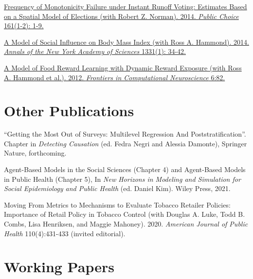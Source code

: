 \documentclass[margin,line]{res}
\newenvironment{publist}{
	\begin{list}{}{%
			\setlength{\itemsep}{0.15in}
			\setlength{\parsep}{0in} \setlength{\parskip}{0in}
			\setlength{\topsep}{0in} \setlength{\partopsep}{0in} 
			\setlength{\leftmargin}{0.15in}
			\setlength{\itemindent}{-0.15in}}}
		{\end{list}}
\begin{document}
\begin{resume}
\begin{publist}
	\item \href{https://joeornstein.github.io/publications/Ornstein-Norman-2014/Ornstein-Norman-2014.pdf}{Frequency of Monotonicity Failure under Instant Runoff Voting: Estimates Based on a Spatial Model of Elections (with Robert Z. Norman). 2014. \textit{Public Choice} 161(1-2): 1-9.}
	
	\item \href{https://joeornstein.github.io/publications/Hammond_et_al-2014-Annals_of_the_New_York_Academy_of_Sciences.pdf}{A Model of Social Influence on Body Mass Index (with Ross A. Hammond). 2014. \textit{Annals of the New York Academy of Sciences} 1331(1): 34-42.}
	
	\item \href{https://joeornstein.github.io/publications/Hammond-2012.pdf}{A Model of Food Reward Learning with Dynamic Reward Exposure (with Ross A. Hammond et al.). 2012. \textit{Frontiers in Computational Neuroscience} 6:82.}	
\end{publist}



\newpage

\section{\sc Other Publications}

\begin{publist}
	\item ``Getting the Most Out of Surveys: Multilevel Regression And Poststratification''. Chapter in \textit{Detecting Causation} (ed. Fedra Negri and Alessia Damonte), Springer Nature, forthcoming.
	\item Agent-Based Models in the Social Sciences (Chapter 4) and Agent-Based Models in Public Health (Chapter 5), In \textit{New Horizons in Modeling and Simulation for Social Epidemiology and Public Health} (ed. Daniel Kim). Wiley Press, 2021. 
	\item Moving From Metrics to Mechanisms to Evaluate Tobacco Retailer Policies: Importance of Retail Policy in Tobacco Control (with Douglas A. Luke, Todd B. Combs, Lisa Henriksen, and Maggie Mahoney). 2020. \textit{American Journal of Public Health} 110(4):431-433 (invited editorial).
\end{publist}



\section{\sc Working Papers}


\end{resume}
\end{document}
